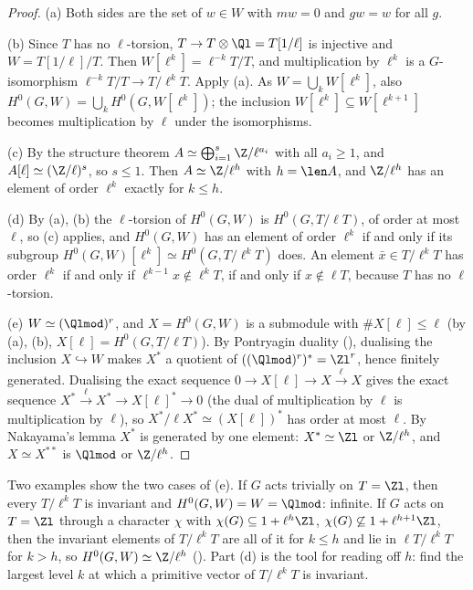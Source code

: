 \begin{proof}
(a) Both sides are the set of $w\in W$ with $mw=0$ and $gw=w$ for all $g$.

(b) Since $T$ has no $\ell$-torsion, $T\to T\otimes\Ql=T[1/\ell]$ is injective and $W=T[1/\ell]/T$. Then $W[\ell^k]=\ell^{-k}T/T$, and multiplication by $\ell^k$ is a
$G$-isomorphism $\ell^{-k}T/T\to T/\ell^kT$. Apply (a). As $W=\bigcup_kW[\ell^k]$, also $H^0(G,W)=\bigcup_kH^0(G,W[\ell^k])$; the inclusion
$W[\ell^k]\subseteq W[\ell^{k+1}]$ becomes multiplication by $\ell$ under the isomorphisms.

(c) By the structure theorem $A\simeq\bigoplus_{i=1}^s\Z/\ell^{a_i}$ with all $a_i\ge1$, and $A[\ell]\simeq(\Z/\ell)^s$, so $s\le1$. Then $A\simeq\Z/\ell^h$ with $h=\len A$,
and $\Z/\ell^h$ has an element of order $\ell^k$ exactly for $k\le h$.

(d) By (a), (b) the $\ell$-torsion of $H^0(G,W)$ is $H^0(G,T/\ell T)$, of order at most $\ell$, so (c) applies, and $H^0(G,W)$ has an element of order $\ell^k$ if
and only if its subgroup $H^0(G,W)[\ell^k]\simeq H^0(G,T/\ell^kT)$ does. An element $\bar x\in T/\ell^kT$ has order $\ell^k$ if and only if $\ell^{k-1}x\notin\ell^kT$, if and
only if $x\notin\ell T$, because $T$ has no $\ell$-torsion.

(e) $W\simeq(\Qlmod)^r$, and $X=H^0(G,W)$ is a submodule with $\#X[\ell]\le\ell$ (by (a), (b), $X[\ell]=H^0(G,T/\ell T)$). By Pontryagin duality (),
dualising the inclusion $X\hookrightarrow W$ makes $X^*$ a quotient of $((\Qlmod)^r)^*=\Zl^r$, hence finitely generated. Dualising the exact sequence
$0\to X[\ell]\to X\xrightarrow{\ell}X$ gives the exact sequence $X^*\xrightarrow{\ell}X^*\to X[\ell]^*\to0$ (the dual of multiplication by $\ell$ is multiplication by $\ell$),
so $X^*/\ell X^*\simeq(X[\ell])^*$ has order at most $\ell$. By Nakayama's lemma $X^*$ is generated by one element: $X^*\simeq\Zl$ or $\Z/\ell^h$, and
$X\simeq X^{**}$ is $\Qlmod$ or $\Z/\ell^h$.
\end{proof}

Two examples show the two cases of (e). If $G$ acts trivially on $T=\Zl$, then every $T/\ell^kT$ is invariant and $H^0(G,W)=W=\Qlmod$: infinite. If $G$ acts on
$T=\Zl$ through a character $\chi$ with $\chi(G)\subseteq1+\ell^h\Zl$, $\chi(G)\not\subseteq1+\ell^{h+1}\Zl$, then the invariant elements of $T/\ell^kT$ are all of it for
$k\le h$ and lie in $\ell T/\ell^kT$ for $k>h$, so $H^0(G,W)\simeq\Z/\ell^h$ (). Part (d) is the tool for reading off $h$: find the
largest level $k$ at which a primitive vector of $T/\ell^kT$ is invariant.

